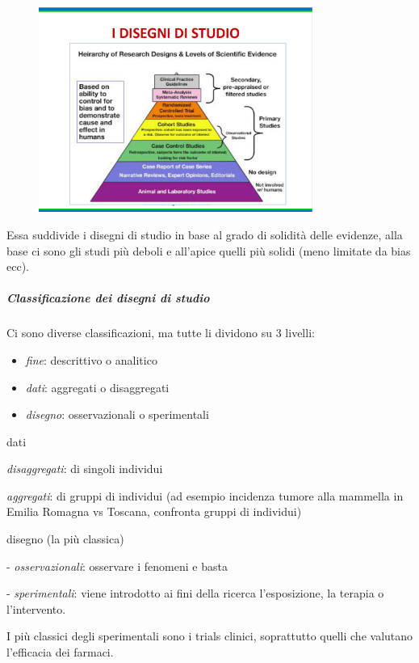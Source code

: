 \begin{figure}[!ht]
\centering
	\includegraphics[width=0.8\textwidth]{04/image2.png}
	\end{figure}

Essa suddivide i disegni di studio in base al grado di solidità delle
evidenze, alla base ci sono gli studi più deboli e all'apice quelli più
solidi (meno limitate da bias ecc).

\subparagraph{Classificazione dei disegni di studio}


Ci sono diverse classificazioni, ma tutte li dividono su 3 livelli:

\begin{itemize}
\item
  \emph{fine}: descrittivo o analitico
\item
  \emph{dati}: aggregati o disaggregati
\item
  \emph{disegno}: osservazionali o sperimentali
\end{itemize}

dati

\emph{disaggregati}: di singoli individui

\emph{aggregati}: di gruppi di individui (ad esempio incidenza tumore
alla mammella in Emilia Romagna vs Toscana, confronta gruppi di
individui)

disegno (la più classica)

- \emph{osservazionali}: osservare i fenomeni e basta

- \emph{sperimentali}: viene introdotto ai fini della ricerca
l'esposizione, la terapia o l'intervento.

I più classici degli sperimentali sono i trials clinici, soprattutto
quelli che valutano l'efficacia dei farmaci.

